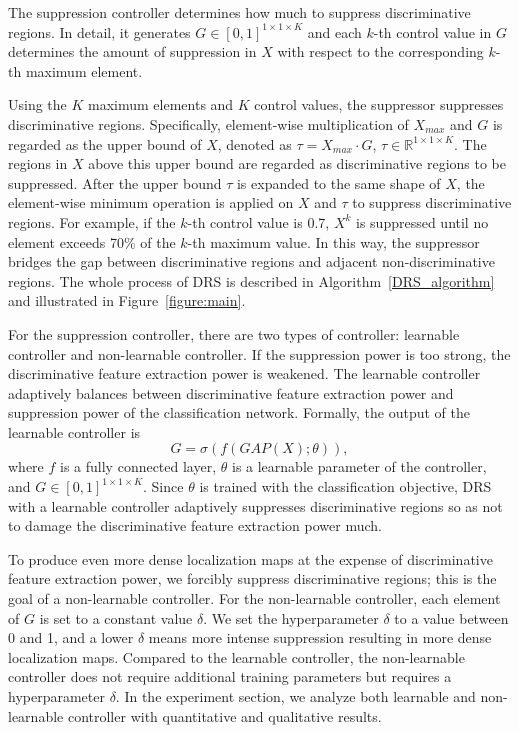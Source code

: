 \documentclass[letterpaper]{article} \usepackage{aaai21}  \usepackage{times}  \usepackage{helvet} \usepackage{courier}  \usepackage[hyphens]{url}  \usepackage{graphicx} \urlstyle{rm} \def\UrlFont{\rm}  \usepackage{natbib}  \usepackage{caption} \frenchspacing  \setlength{\pdfpagewidth}{8.5in}  \setlength{\pdfpageheight}{11in}
\begin{document}
The suppression controller determines how much to suppress discriminative regions.
In detail, it generates $G \in [0, 1]^{1 \times 1 \times K}$ and each $k$-th control value in $G$ determines the amount of suppression in $X$ with respect to the corresponding $k$-th maximum element.

Using the $K$ maximum elements and $K$ control values, the suppressor suppresses discriminative regions. Specifically, element-wise multiplication of $X_{max}$ and $G$ is regarded as the upper bound of $X$, denoted as $\tau = X_{max} \cdot G$, $\tau \in \mathbb{R}^{1 \times 1 \times K}$.
The regions in $X$ above this upper bound are regarded as discriminative regions to be suppressed. After the upper bound $\tau$ is expanded to the same shape of $X$, the element-wise minimum operation is applied on $X$ and $\tau$ to suppress discriminative regions. 
For example, if the $k$-th control value is 0.7, $X^k$ is suppressed until no element exceeds 70\% of the $k$-th maximum value.
In this way, the suppressor bridges the gap between discriminative regions and adjacent non-discriminative regions.
The whole process of DRS is described in Algorithm~\ref{DRS_algorithm} and illustrated in Figure~\ref{figure:main}.

For the suppression controller, there are two types of controller: learnable controller and non-learnable controller.
If the suppression power is too strong, the discriminative feature extraction power is weakened.
The learnable controller adaptively balances between discriminative feature extraction power and suppression power of the classification network. 
Formally, the output of the learnable controller is
\begin{equation}
    G = \sigma(f(GAP(X);\theta)), 
\end{equation}
where $f$ is a fully connected layer, $\theta$ is a learnable parameter of the controller, and $G \in [0, 1]^{1 \times 1 \times K}$.
Since $\theta$ is trained with the classification objective, DRS with a learnable controller adaptively suppresses 
discriminative regions so as not to damage the discriminative feature extraction power much.

To produce even more dense localization maps at the expense of discriminative feature extraction power, we forcibly suppress discriminative regions; this is the goal of a non-learnable controller.
For the non-learnable controller, each element of $G$ is set to a constant value $\delta$.
We set the hyperparameter $\delta$ to a value between 0 and 1, and a lower $\delta$ means more intense suppression resulting in more dense localization maps.
Compared to the learnable controller, the non-learnable controller does not require additional training parameters but requires a hyperparameter $\delta$.
In the experiment section, we analyze both learnable and non-learnable controller with quantitative and qualitative results.
\end{document}
